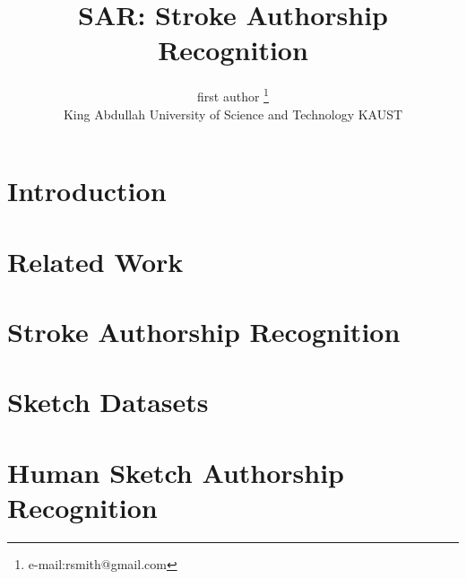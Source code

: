 \documentclass[annual]{acmsiggraph}
\title{SAR: Stroke Authorship Recognition}
\author{first author \thanks{e-mail:rsmith@gmail.com}\\King Abdullah University of Science and Technology KAUST}
\begin{document}
\maketitle
\begin{abstract}

\end{abstract}



\TOGlinkslist

\copyrightspace
\vspace{-2mm}
\section{Introduction}
\vspace{-2mm}


\vspace{-2mm}
\section{Related Work}
\vspace{-2mm}


\vspace{-2mm}
\section{Stroke Authorship Recognition} \label{sec:SAR}
\vspace{-2mm}



\vspace{-2mm}
\section{Sketch Datasets}\label{sec:datasets}
\vspace{-2mm}


\vspace{-2mm}
\section{Human Sketch Authorship Recognition}\label{sec:humanexps}
\vspace{-2mm}

\end{document}
